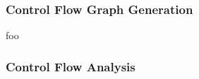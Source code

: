 
\subsubsection{Control Flow Graph Generation}
\label{sec:cfg_generation}


foo


\subsubsection{Control Flow Analysis}







%

